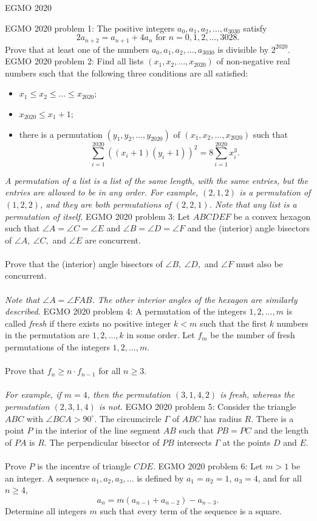 EGMO 2020 

EGMO 2020 problem 1:  The positive integers $a_0, a_1, a_2, \ldots, a_{3030}$ satisfy
\[ 2a_{n + 2} = a_{n + 1} + 4a_n \text{ for } n = 0, 1, 2, \ldots, 3028. \]
Prove that at least one of the numbers $a_0, a_1, a_2, \ldots, a_{3030}$ is divisible by $2^{2020}$. 
EGMO 2020 problem 2:  Find all lists $(x_1, x_2, \ldots, x_{2020})$ of non-negative real numbers such that the following three conditions are all satisfied:
\begin{itemize}
  \item $x_1 \le x_2 \le \ldots \le x_{2020}$;
  \item $x_{2020} \le x_1  + 1$;
  \item there is a permutation $(y_1, y_2, \ldots, y_{2020})$ of $(x_1, x_2, \ldots, x_{2020})$ such that
\[ \sum_{i = 1}^{2020} ((x_i + 1)(y_i + 1))^2 = 8 \sum_{i = 1}^{2020} x_i^3. \]
\end{itemize}
\textit{A permutation of a list is a list of the same length, with the same entries, but the entries are allowed to be in any order.  For example, $(2, 1, 2)$ is a permutation of $(1, 2, 2)$, and they are both permutations of $(2, 2, 1)$.  Note that any list is a permutation of itself.} 
EGMO 2020 problem 3:  Let $ABCDEF$ be a convex hexagon such that $\angle A = \angle C = \angle E$ and $\angle B = \angle D = \angle F$ and the (interior) angle bisectors of $\angle A, ~\angle C,$ and $\angle E$ are concurrent. \\\\
Prove that the (interior) angle bisectors of $\angle B, ~\angle D, $ and $\angle F$ must also be concurrent. \\\\
\textit{Note that $\angle A = \angle FAB$.  The other interior angles of the hexagon are similarly described.} 
EGMO 2020 problem 4:  A permutation of the integers $1, 2, \ldots, m$ is called \textit{fresh} if there exists no positive integer $k < m$ such that the first $k$ numbers in the permutation are $1, 2, \ldots, k$ in some order.  Let $f_m$ be the number of fresh permutations of the integers $1, 2, \ldots, m$. \\\\
Prove that $f_n \ge n \cdot f_{n - 1}$ for all $n \ge 3$. \\\\
\textit{For example, if $m = 4$, then the permutation $(3, 1, 4, 2)$ is fresh, whereas the permutation $(2, 3, 1, 4)$ is not.} 
EGMO 2020 problem 5:  Consider the triangle $ABC$ with $\angle BCA > 90^{\circ}$.  The circumcircle $\Gamma$ of $ABC$ has radius $R$.  There is a point $P$ in the interior of the line segment $AB$ such that $PB = PC$ and the length of $PA$ is $R$.  The perpendicular bisector of $PB$ intersects $\Gamma$ at the points $D$ and $E$. \\\\
Prove $P$ is the incentre of triangle $CDE$. 
EGMO 2020 problem 6:  Let $m > 1$ be an integer.  A sequence $a_1, a_2, a_3, \ldots$ is defined by $a_1 = a_2 = 1$, $a_3 = 4$, and for all $n \ge 4$,
\[ a_n = m(a_{n - 1} + a_{n - 2}) - a_{n - 3}. \]
Determine all integers $m$ such that every term of the sequence is a square. 

